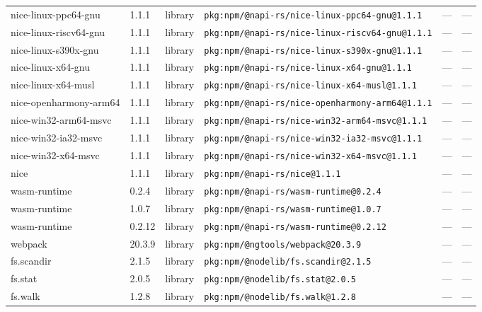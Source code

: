 \documentclass[11pt,a4paper]{article}
\begin{document}
\begin{longtable}{|p{4cm}|p{2cm}|p{1.6cm}|p{5cm}|p{1.5cm}|p{3.5cm}|}
\raggedright nice-linux-ppc64-gnu & 1.1.1 & library & \small\texttt{pkg:npm/@napi-rs/nice-linux-ppc64-gnu@1.1.1} & — & \small — \\
\raggedright nice-linux-riscv64-gnu & 1.1.1 & library & \small\texttt{pkg:npm/@napi-rs/nice-linux-riscv64-gnu@1.1.1} & — & \small — \\
\raggedright nice-linux-s390x-gnu & 1.1.1 & library & \small\texttt{pkg:npm/@napi-rs/nice-linux-s390x-gnu@1.1.1} & — & \small — \\
\raggedright nice-linux-x64-gnu & 1.1.1 & library & \small\texttt{pkg:npm/@napi-rs/nice-linux-x64-gnu@1.1.1} & — & \small — \\
\raggedright nice-linux-x64-musl & 1.1.1 & library & \small\texttt{pkg:npm/@napi-rs/nice-linux-x64-musl@1.1.1} & — & \small — \\
\raggedright nice-openharmony-arm64 & 1.1.1 & library & \small\texttt{pkg:npm/@napi-rs/nice-openharmony-arm64@1.1.1} & — & \small — \\
\raggedright nice-win32-arm64-msvc & 1.1.1 & library & \small\texttt{pkg:npm/@napi-rs/nice-win32-arm64-msvc@1.1.1} & — & \small — \\
\raggedright nice-win32-ia32-msvc & 1.1.1 & library & \small\texttt{pkg:npm/@napi-rs/nice-win32-ia32-msvc@1.1.1} & — & \small — \\
\raggedright nice-win32-x64-msvc & 1.1.1 & library & \small\texttt{pkg:npm/@napi-rs/nice-win32-x64-msvc@1.1.1} & — & \small — \\
\raggedright nice & 1.1.1 & library & \small\texttt{pkg:npm/@napi-rs/nice@1.1.1} & — & \small — \\
\raggedright wasm-runtime & 0.2.4 & library & \small\texttt{pkg:npm/@napi-rs/wasm-runtime@0.2.4} & — & \small — \\
\raggedright wasm-runtime & 1.0.7 & library & \small\texttt{pkg:npm/@napi-rs/wasm-runtime@1.0.7} & — & \small — \\
\raggedright wasm-runtime & 0.2.12 & library & \small\texttt{pkg:npm/@napi-rs/wasm-runtime@0.2.12} & — & \small — \\
\raggedright webpack & 20.3.9 & library & \small\texttt{pkg:npm/@ngtools/webpack@20.3.9} & — & \small — \\
\raggedright fs.scandir & 2.1.5 & library & \small\texttt{pkg:npm/@nodelib/fs.scandir@2.1.5} & — & \small — \\
\raggedright fs.stat & 2.0.5 & library & \small\texttt{pkg:npm/@nodelib/fs.stat@2.0.5} & — & \small — \\
\raggedright fs.walk & 1.2.8 & library & \small\texttt{pkg:npm/@nodelib/fs.walk@1.2.8} & — & \small — \\

\end{longtable}
\end{document}
